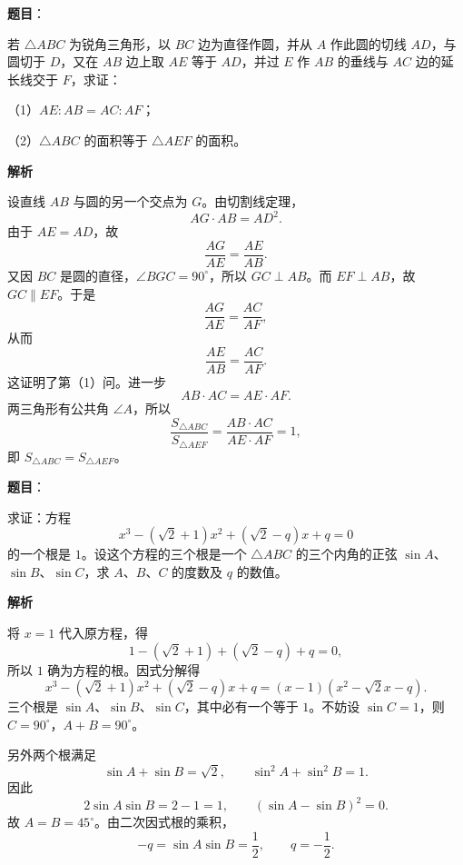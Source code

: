 \begin{answer}

\textbf{题目}：

若 $\triangle ABC$ 为锐角三角形，以 $BC$ 边为直径作圆，并从 $A$ 作此圆的切线 $AD$，与圆切于 $D$，又在 $AB$ 边上取 $AE$ 等于 $AD$，并过 $E$ 作 $AB$ 的垂线与 $AC$ 边的延长线交于 $F$，求证：

（1）$AE:AB=AC:AF$；

（2）$\triangle ABC$ 的面积等于 $\triangle AEF$ 的面积。

\textbf{解析}
\nopagebreak[4]
\begin{center}\end{center}
\nopagebreak[4]
设直线 $AB$ 与圆的另一个交点为 $G$。由切割线定理，
\[
AG\cdot AB=AD^2.
\]
由于 $AE=AD$，故
\[
\frac{AG}{AE}=\frac{AE}{AB}.
\]
又因 $BC$ 是圆的直径，$\angle BGC=90^\circ$，所以 $GC\perp AB$。而 $EF\perp AB$，故 $GC\parallel EF$。于是
\[
\frac{AG}{AE}=\frac{AC}{AF},
\]
从而
\[
\frac{AE}{AB}=\frac{AC}{AF}.
\]
这证明了第（1）问。进一步
\[
AB\cdot AC=AE\cdot AF.
\]
两三角形有公共角 $\angle A$，所以
\[
\frac{S_{\triangle ABC}}{S_{\triangle AEF}}
=\frac{AB\cdot AC}{AE\cdot AF}=1,
\]
即 $S_{\triangle ABC}=S_{\triangle AEF}$。


\end{answer}
\begin{answer}

\textbf{题目}：

求证：方程
\[
x^3-(\sqrt2+1)x^2+(\sqrt2-q)x+q=0
\]
的一个根是 $1$。设这个方程的三个根是一个 $\triangle ABC$ 的三个内角的正弦 $\sin A$、$\sin B$、$\sin C$，求 $A$、$B$、$C$ 的度数及 $q$ 的数值。

\textbf{解析}

将 $x=1$ 代入原方程，得
\[
1-(\sqrt2+1)+(\sqrt2-q)+q=0,
\]
所以 $1$ 确为方程的根。因式分解得
\[
x^3-(\sqrt2+1)x^2+(\sqrt2-q)x+q
=(x-1)(x^2-\sqrt2x-q).
\]
三个根是 $\sin A$、$\sin B$、$\sin C$，其中必有一个等于 $1$。不妨设 $\sin C=1$，则 $C=90^\circ$，$A+B=90^\circ$。

另外两个根满足
\[
\sin A+\sin B=\sqrt2,
\qquad \sin^2A+\sin^2B=1.
\]
因此
\[
2\sin A\sin B=2-1=1,
\qquad (\sin A-\sin B)^2=0.
\]
故 $A=B=45^\circ$。由二次因式根的乘积，
\[
-q=\sin A\sin B=\frac12,
\qquad q=-\frac12.
\]


\end{answer}